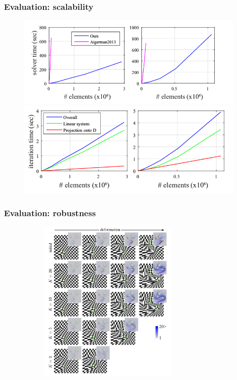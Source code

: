 \documentclass[serif,mathserif]{beamer}
\begin{document}
\begin{frame}
 \frametitle{Evaluation: scalability}
 \begin{figure}[t]
  \centering  
  \begin{minipage}[t][0.9\textheight][s]{1\textwidth}
    \centering
    \includegraphics[scale=0.35]{img/sc0.png} 
    \vfill
    \includegraphics[scale=0.35]{img/sc1.png}
  \end{minipage}
 \end{figure}
\end{frame}

\begin{frame}
 \frametitle{Evaluation: robustness}
 \begin{figure}[t]
  \centering
  \includegraphics[width=9cm, height=8cm]{img/robustness.png}
 \end{figure}
\end{frame}
\end{document}
